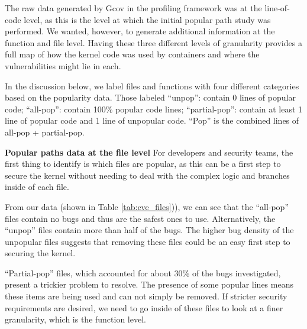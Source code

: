 The raw data generated by Gcov in the profiling framework was at the line-of-code level, as this is the level at which  the initial popular path study \cite{Lock-in-Pop} was performed. 
We wanted, however, to generate  additional information at the function and file level. 
Having these three different levels of granularity provides a full map of how the kernel code was used by containers and where the vulnerabilities might lie in each.

In the discussion below, we label files and functions with four different categories based on the popularity data. 
Those labeled ``unpop'': contain 0 lines of popular code; ``all-pop'': contain 100\% popular code lines; ``partial-pop'': contain at least 1 line of popular code 
and 1 line of unpopular code. ``Pop'' is the combined lines of all-pop + partial-pop.

\textbf{Popular paths data at the file level}
\newline
For developers and security teams, the first thing to identify is which files are popular, as this can be a first step to secure the kernel without needing to 
deal with the complex logic and branches inside of each file. 

From our data (shown in Table \ref{tab:cve_files})), we can see that the ``all-pop'' files contain no bugs  and thus are the safest ones to use.  
Alternatively, the  ``unpop'' files contain more than half of the bugs. The higher bug density of the unpopular files suggests that removing these files could be an easy first step to securing the kernel. 

 ``Partial-pop'' files, which accounted for about 30\% of the bugs investigated, present a trickier problem to resolve. 
 The presence of some popular lines means these items are being used and can not simply be removed. If stricter security requirements are desired, 
 we need to go inside of these files to look at a finer granularity, which is the function level. 
 
